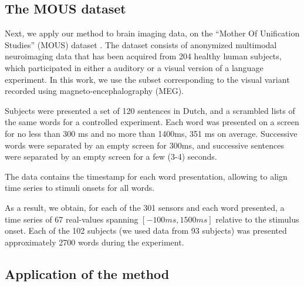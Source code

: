 \subsection{The MOUS dataset}

Next, we apply our method to brain imaging data, on the ``Mother Of Unification
Studies'' (MOUS) dataset \cite{schoffelen2019204}. The dataset consists of
anonymized multimodal neuroimaging data that has been acquired from 204 healthy
human subjects, which participated in either a auditory or a visual version of a
language experiment. In this work, we use the subset corresponding to the visual
variant recorded using magneto-encephalography (MEG).

Subjects were presented a set of 120 sentences in Dutch, and a scrambled lists
of the same words for a controlled experiment. Each word was presented on a
screen for no less than 300 ms and no more than 1400ms, 351 ms on average.
Successive words were separated by an empty screen for 300ms, and successive
sentences were separated by an empty screen for a few (3-4) seconds.

The data contains the timestamp for each word presentation, allowing to align
time series to stimuli onsets for all words.

As a result, we obtain, for each of the 301 sensors and each word presented, a
time series of 67 real-values spanning $\left[-100ms, 1500ms\right]$ relative to
the stimulus onset. Each of the 102 subjects (we used data from 93 subjects) was
presented approximately 2700 words during the experiment.


\subsection{Application of the method}



